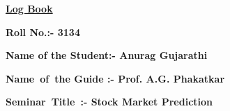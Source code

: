 \documentclass[12pt]{article}
\begin{document}
\begin{Center}
{\fontsize{14pt}{16.8pt}\selectfont \textbf{\uline{Log Book }}\par}
\end{Center}\par

{\fontsize{14pt}{16.8pt}\selectfont \textbf{Roll No.\tab \tab \tab :- 3134}\par}\par

{\fontsize{14pt}{16.8pt}\selectfont \textbf{Name of the Student\tab :- Anurag Gujarathi}\par}\par

{\fontsize{14pt}{16.8pt}\selectfont \textbf{Name\ of\ the Guide   \tab :- Prof. A.G. Phakatkar}\par}\par

{\fontsize{14pt}{16.8pt}\selectfont \textbf{Seminar\ Title\   \tab \tab :- Stock Market Prediction}\par}\par


\vspace{\baselineskip}


\end{document}
